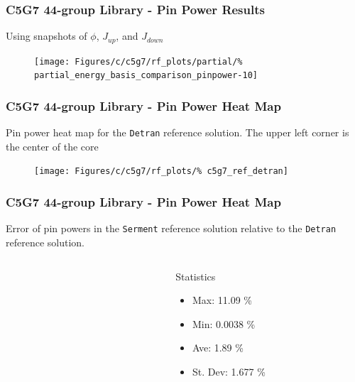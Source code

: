 \documentclass[fleqn]{beamer}
\begin{document}
  \begin{frame}
    \frametitle{C5G7 44-group Library - Pin Power Results}
    \centering
    Using snapshots of $\phi$, $J_{up}$, and $J_{down}$
    \begin{figure}
    \texttt{[image: Figures/c/c5g7/rf\_plots/partial/\%
        partial\_energy\_basis\_comparison\_pinpower-10]}
    \end{figure}
  \end{frame}
  
  \begin{frame}
      \frametitle{C5G7 44-group Library - Pin Power Heat Map}
      \centering
      Pin power heat map for the {\tt Detran} reference solution.  The 
      upper left corner is the center of the core
      \begin{figure}
          \texttt{[image: Figures/c/c5g7/rf\_plots/\%
              c5g7\_ref\_detran]}
      \end{figure}
  \end{frame}
  
  \begin{frame}
      \frametitle{C5G7 44-group Library - Pin Power Heat Map}
      \centering
      Error of pin powers in the {\tt Serment} reference 
      solution relative to the {\tt Detran} reference solution.
      \begin{columns}[T]
          \begin{column}{0.5\textwidth}
              \begin{figure}
              \end{figure}
          \end{column}
          \begin{column}{0.5\textwidth}
              \begin{block}{Statistics}
                  \begin{itemize}
                      \item Max: 11.09 \%
                      \item Min: 0.0038 \%
                      \item Ave: 1.89 \%
                      \item St. Dev: 1.677 \%
                  \end{itemize}
              \end{block}
          \end{column}
      \end{columns}
  \end{frame}
  
\end{document}
